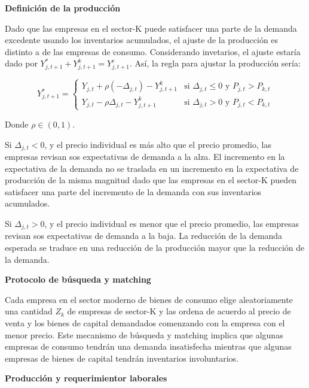 \documentclass[12pt,a4paper]{article}
\begin{document}
\vspace{.2cm}
\textbf{Definición de la producción}
\vspace{.2cm}

Dado que las empresas en el sector-K puede satisfacer una parte de la demanda excedente usando los inventarios acumulados, el ajuste de la producción es distinto a de las empresas de consumo. Considerando invetarios, el ajuste estaría dado por $Y_{j,t+1}^*+Y_{j,t+1}^k= Y_{j,t+1}^e$. Así, la regla para ajustar la producción sería:

\begin{equation}
  Y_{j,t+1}^* =
    \begin{cases}
   	  Y_{j,t} + \rho (- \Delta_{j,t})- Y_{j,t+1}^k  & \text{si $\Delta_{j,t} \leq 0$ y $P_{j,t} > P_{k,t}$}\\
Y_{j,t} - \rho \Delta_{j,t}- Y_{j,t+1}^k  & \text{si $\Delta_{j,t} > 0$ y $P_{j,t} < P_{k,t}$}
    \end{cases}  
\end{equation}

Donde $\rho \in (0,1)$.

Si $\Delta_{j,t} <0$, y el precio individual es más alto que el precio promedio, las empresas revisan sos expectativas de demanda a la alza. El incremento en la expectativa de la demanda no se traslada en un incremento en la expectativa de producción de la misma magnitud dado que las empresas en el sector-K pueden satisfacer una parte del incremento de la demanda con sus inventarios acumulados. 

Si $\Delta_{j,t} >0$, y el precio individual es menor que el precio promedio, las empresas revisan sos expectativas de demanda a la baja. La reducción de la demanda esperada se traduce en una reducción de la producción mayor que la reducción de la demanda.

\vspace{.2cm}
\textbf{Protocolo de búsqueda y matching}
\vspace{.2cm}

Cada empresa en el sector moderno de bienes de consumo elige aleatoriamente una cantidad $Z_k$ de empresas de sector-K y las ordena de acuerdo al precio de venta y los bienes de capital demandados comenzando con la empresa con el menor precio. Este mecanismo de búsqueda y matching implica que algunas empresas de consumo tendrán una demanda insatisfecha mientras que algunas empresas de bienes de capital tendrán inventarios involuntarios.

\vspace{.2cm}
\textbf{Producción y requerimientor laborales}
\vspace{.2cm}
 
\end{document}
